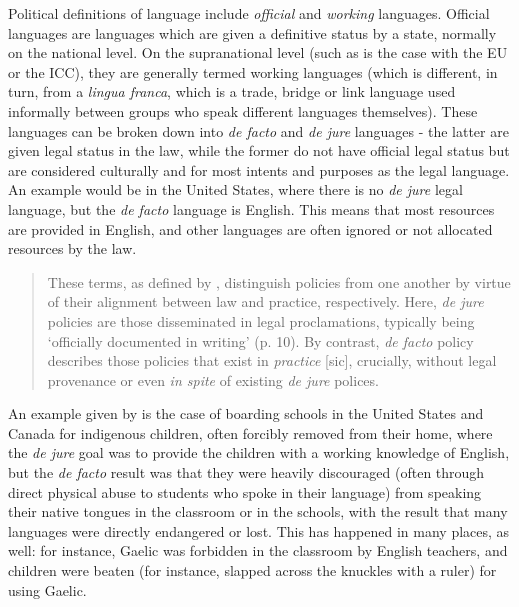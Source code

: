 Political definitions of language include \textit{official} and \textit{working} languages. Official languages are languages which are given a definitive status by a state, normally on the national level. On the supranational level (such as is the case with the EU or the ICC), they are generally termed working languages (which is different, in turn, from a \textit{lingua franca}, which is a trade, bridge or link language used informally between groups who speak different languages themselves). These languages can be broken down into {\it de facto} and {\it de jure} languages - the latter are given legal status in the law, while the former do not have official legal status but are considered culturally and for most intents and purposes as the legal language. An example would be in the United States, where there is no {\it de jure} legal language, but the {\it de facto} language is English. This means that most resources are provided in English, and other languages are often ignored or not allocated resources by the law.

\begin{quote}
These terms, as defined by \citet{johnson2013language}, distinguish policies from one another by virtue of their alignment between law and practice, respectively. Here, {\it de jure} policies are those disseminated in legal proclamations, typically being `officially documented in writing' (p. 10). By contrast, {\it de facto} policy describes those policies that exist in {\it practice} [sic], crucially, without legal provenance or even {\it in spite} of existing \textit{de jure} polices. \citep{hanks2017policy}
\end{quote}

An example given by \citet{hanks2017policy} is the case of boarding schools in the United States and Canada for indigenous children, often forcibly removed from their home, where the {\it de jure} goal was to provide the children with a working knowledge of English, but the {\it de facto} result was that they were heavily discouraged (often through direct physical abuse to students who spoke in their language) from speaking their native tongues in the classroom or in the schools, with the result that many languages were directly endangered or lost. This has happened in many places, as well: for instance, Gaelic was forbidden in the classroom by English teachers, and children were beaten (for instance, slapped across the knuckles with a ruler) for using Gaelic.

